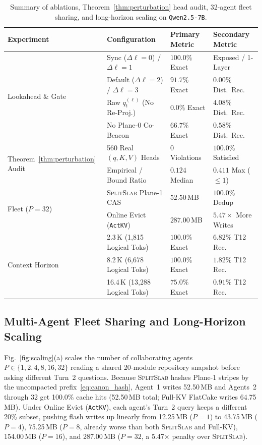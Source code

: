 \documentclass[pdflatex,sn-mathphys-num]{sn-jnl}
\theoremstyle{thmstyleone}
\newcommand{\SplitSlab}{\textsc{SplitSlab}}
\begin{document}
\begin{table}[t]
\centering
\caption{Summary of ablations, Theorem~\ref{thm:perturbation} head audit, 32-agent fleet sharing, and long-horizon scaling on \texttt{Qwen2.5-7B}.}
\label{tab:summary_audit}
\footnotesize
\renewcommand{\arraystretch}{1.15}
\setlength{\tabcolsep}{6pt}
\begin{tabular}{@{}llll@{}}
\toprule
\textbf{Experiment} & \textbf{Configuration} & \textbf{Primary Metric} & \textbf{Secondary Metric} \\
\midrule
\multirow{4}{*}{Lookahead \& Gate}
 & Sync ($\Delta\ell{=}0$) / $\Delta\ell{=}1$ & $100.0\%$ Exact & Exposed / 1-Layer \\
 & Default ($\Delta\ell{=}2$) / $\Delta\ell{=}3$ & $91.7\%$ Exact & $0.00\%$ Dist.\ Rec. \\
 & Raw $q_t^{(\ell)}$ (No Re-Proj.) & $0.0\%$ Exact & $4.08\%$ Dist.\ Rec. \\
 & No Plane-0 Co-Beacon & $66.7\%$ Exact & $0.58\%$ Dist.\ Rec. \\
\midrule
\multirow{2}{*}{Theorem~\ref{thm:perturbation} Audit}
 & 560 Real $(q, K, V)$ Heads & $0$ Violations & $100.0\%$ Satisfied \\
 & Empirical / Bound Ratio & $0.124$ Median & $0.411$ Max ($\le 1$) \\
\midrule
\multirow{2}{*}{Fleet ($P{=}32$)}
 & \SplitSlab{} Plane-1 CAS & $52.50$\,MB & $100.0\%$ Dedup \\
 & Online Evict (\texttt{ActKV}) & $287.00$\,MB & $5.47\times$ More Writes \\
\midrule
\multirow{3}{*}{Context Horizon}
 & 2.3\,K (1,815 Logical Toks) & $100.0\%$ Exact & $6.82\%$ T12 Rec. \\
 & 8.2\,K (6,678 Logical Toks) & $100.0\%$ Exact & $1.82\%$ T12 Rec. \\
 & 16.4\,K (13,288 Logical Toks) & $75.0\%$ Exact & $0.91\%$ T12 Rec. \\
\bottomrule
\end{tabular}
\end{table}

\subsection{Multi-Agent Fleet Sharing and Long-Horizon Scaling}\label{subsec:scaling}

Fig.~\ref{fig:scaling}(a) scales the number of collaborating agents $P \in \{1, 2, 4, 8, 16, 32\}$ reading a shared 20-module repository snapshot before asking different Turn~2 questions. Because \SplitSlab{} hashes Plane-1 stripes by the uncompacted prefix~\eqref{eq:canon_hash}, Agent~1 writes 52.50\,MB and Agents~2 through 32 get 100.0\% cache hits (52.50\,MB total; Full-KV FlatCake writes 64.75\,MB). Under Online Evict (\texttt{ActKV}), each agent's Turn~2 query keeps a different 20\% subset, pushing flash writes up linearly from 12.25\,MB ($P=1$) to 43.75\,MB ($P=4$), 75.25\,MB ($P=8$, already worse than both \SplitSlab{} and Full-KV), 154.00\,MB ($P=16$), and 287.00\,MB ($P=32$, a 5.47$\times$ penalty over \SplitSlab{}).
\end{document}
